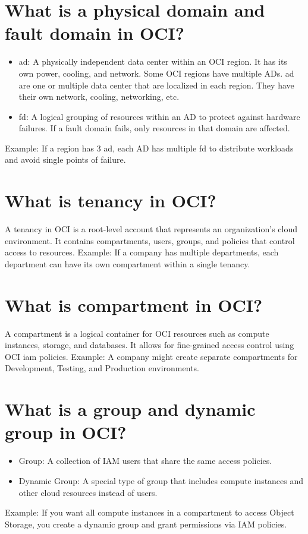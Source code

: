 \documentclass[../main.tex]{subfiles}
\begin{document}
\section{What is a physical domain and fault domain in OCI?}
\begin{itemize}
  \item {\acrfull{ad}: A physically independent data center within an OCI region. 
    It has its own power, cooling, and network. Some OCI regions have multiple ADs.
    \acrshort{ad} are one or multiple data center that are localized in each region.
    They have their own network, cooling, networking, etc.
  }
  \item {\acrfull{fd}: A logical grouping of resources within an AD to protect against hardware failures.
    If a fault domain fails, only resources in that domain are affected.}
\end{itemize}
Example: If a region has 3 \acrlong{ad}, each AD has multiple \acrlong{fd} to distribute workloads and avoid single points of failure.

\section{What is tenancy in OCI?}
A tenancy in OCI is a root-level account that represents an organization’s cloud environment.
It contains compartments, users, groups, and policies that control access to resources.
Example: If a company has multiple departments, each department can have its own compartment within a single tenancy.

\section{What is compartment in OCI?}
A compartment is a logical container for OCI resources such as compute instances, storage, and databases.
It allows for fine-grained access control using OCI \acrfull{iam} policies.
Example: A company might create separate compartments for Development, Testing, and Production environments.

\section{What is a group and dynamic group in OCI?}
\begin{itemize}
  \item Group: A collection of IAM users that share the same access policies.
  \item Dynamic Group: A special type of group that includes compute instances and other cloud resources instead of users.
\end{itemize}
Example: If you want all compute instances in a compartment to access Object Storage, you create a dynamic group and grant permissions via IAM policies.
\end{document}
